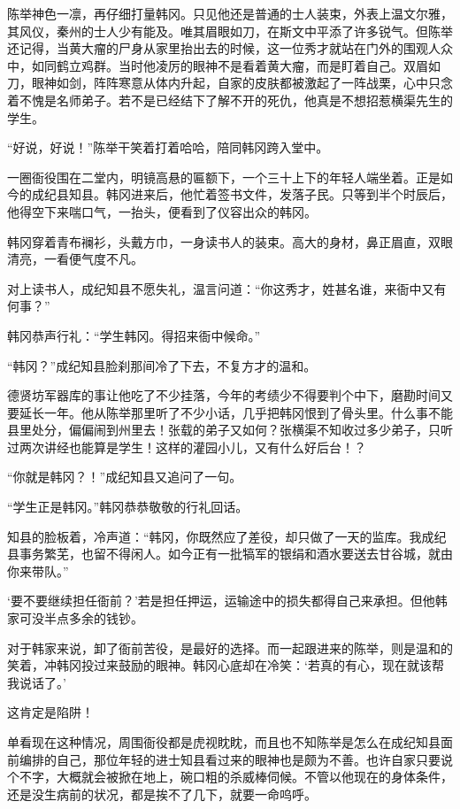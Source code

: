 陈举神色一凛，再仔细打量韩冈。只见他还是普通的士人装束，外表上温文尔雅，其风仪，秦州的士人少有能及。唯其眉眼如刀，在斯文中平添了许多锐气。但陈举还记得，当黄大瘤的尸身从家里抬出去的时候，这一位秀才就站在门外的围观人众中，如同鹤立鸡群。当时他凌厉的眼神不是看着黄大瘤，而是盯着自己。双眉如刀，眼神如剑，阵阵寒意从体内升起，自家的皮肤都被激起了一阵战栗，心中只念着不愧是名师弟子。若不是已经结下了解不开的死仇，他真是不想招惹横渠先生的学生。

“好说，好说！”陈举干笑着打着哈哈，陪同韩冈跨入堂中。

一圈衙役围在二堂内，明镜高悬的匾额下，一个三十上下的年轻人端坐着。正是如今的成纪县知县。韩冈进来后，他忙着签书文件，发落子民。只等到半个时辰后，他得空下来喘口气，一抬头，便看到了仪容出众的韩冈。

韩冈穿着青布襕衫，头戴方巾，一身读书人的装束。高大的身材，鼻正眉直，双眼清亮，一看便气度不凡。

对上读书人，成纪知县不愿失礼，温言问道：“你这秀才，姓甚名谁，来衙中又有何事？”

韩冈恭声行礼：“学生韩冈。得招来衙中候命。”

“韩冈？”成纪知县脸刹那间冷了下去，不复方才的温和。

德贤坊军器库的事让他吃了不少挂落，今年的考绩少不得要判个中下，磨勘时间又要延长一年。他从陈举那里听了不少小话，几乎把韩冈恨到了骨头里。什么事不能县里处分，偏偏闹到州里去！张载的弟子又如何？张横渠不知收过多少弟子，只听过两次讲经也能算是学生！这样的灌园小儿，又有什么好后台！？

“你就是韩冈？！”成纪知县又追问了一句。

“学生正是韩冈。”韩冈恭恭敬敬的行礼回话。

知县的脸板着，冷声道：“韩冈，你既然应了差役，却只做了一天的监库。我成纪县事务繁芜，也留不得闲人。如今正有一批犒军的银绢和酒水要送去甘谷城，就由你来带队。”

‘要不要继续担任衙前？’若是担任押运，运输途中的损失都得自己来承担。但他韩家可没半点多余的钱钞。

对于韩家来说，卸了衙前苦役，是最好的选择。而一起跟进来的陈举，则是温和的笑着，冲韩冈投过来鼓励的眼神。韩冈心底却在冷笑：‘若真的有心，现在就该帮我说话了。’

这肯定是陷阱！

单看现在这种情况，周围衙役都是虎视眈眈，而且也不知陈举是怎么在成纪知县面前编排的自己，那位年轻的进士知县看过来的眼神也是颇为不善。也许自家只要说个不字，大概就会被掀在地上，碗口粗的杀威棒伺候。不管以他现在的身体条件，还是没生病前的状况，都是挨不了几下，就要一命呜呼。

